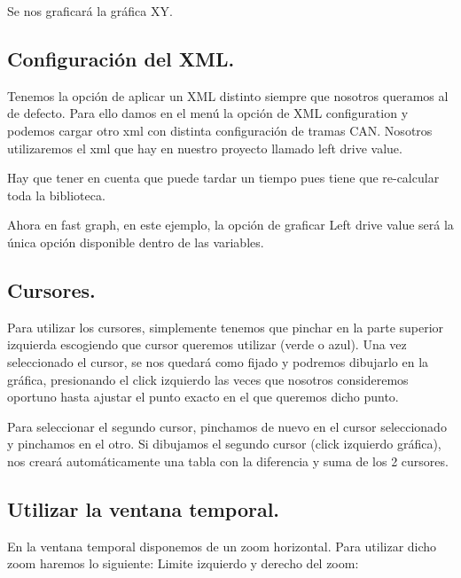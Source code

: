 Se nos graficará la gráfica XY.

\subsection{Configuración del XML.}

Tenemos la opción de aplicar un XML distinto siempre que nosotros queramos al de defecto. Para ello damos en el menú la opción de XML configuration y podemos cargar otro xml con distinta configuración de tramas CAN. Nosotros utilizaremos el xml que hay en nuestro proyecto llamado left drive value.

Hay que tener en cuenta que puede tardar un tiempo pues tiene que re-calcular toda la biblioteca.

Ahora en fast graph, en este ejemplo, la opción de graficar Left drive value será la única opción disponible dentro de las variables.

\subsection{Cursores.}
Para utilizar los cursores, simplemente tenemos que pinchar en la parte superior izquierda escogiendo que cursor queremos utilizar (verde o azul). 
Una vez seleccionado el cursor, se nos quedará como fijado y podremos dibujarlo en la gráfica, presionando el click izquierdo las veces que nosotros consideremos oportuno hasta ajustar el punto exacto en el que queremos dicho punto.

Para seleccionar el segundo cursor, pinchamos de nuevo en el cursor seleccionado y pinchamos en el otro. Si dibujamos el segundo cursor (click izquierdo gráfica), nos creará automáticamente una tabla con la diferencia y suma de los 2 cursores.


\subsection{Utilizar la ventana temporal.}
En la ventana temporal disponemos de un zoom horizontal. Para utilizar dicho zoom haremos lo siguiente:
Limite izquierdo y derecho del zoom:



